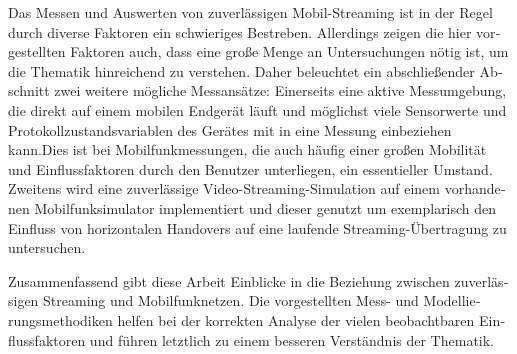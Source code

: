 \begin{german}
Das Messen und Auswerten von zuverlässigen Mobil-Streaming ist in der Regel durch diverse Faktoren ein schwieriges Bestreben. Allerdings zeigen die hier vorgestellten Faktoren auch, dass eine große Menge an Untersuchungen nötig ist, um die Thematik hinreichend zu verstehen. Daher beleuchtet ein abschließender Abschnitt zwei weitere mögliche Messansätze: Einerseits eine aktive Messumgebung, die direkt auf einem mobilen Endgerät läuft und möglichst viele Sensorwerte und Protokollzustandsvariablen des Gerätes mit in eine Messung einbeziehen kann.Dies ist bei Mobilfunkmessungen, die auch häufig einer großen Mobilität und Einflussfaktoren durch den Benutzer unterliegen, ein essentieller Umstand. Zweitens wird eine zuverlässige Video-Streaming-Simulation auf einem vorhandenen Mobilfunksimulator implementiert und dieser genutzt um exemplarisch den Einfluss von horizontalen Handovers auf eine laufende Streaming-Übertragung zu untersuchen.

Zusammenfassend gibt diese Arbeit Einblicke in die Beziehung zwischen zuverlässigen Streaming und Mobilfunknetzen. Die vorgestellten Mess- und Modellierungsmethodiken helfen bei der korrekten Analyse der vielen beobachtbaren Einflussfaktoren und führen letztlich zu einem besseren Verständnis der Thematik.
\end{german}